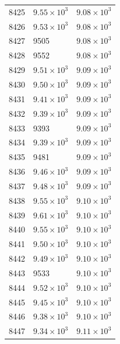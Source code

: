 \begin{table}[H]
\begin{tabular}{lll}
8425 & $\displaystyle 9.55 \times 10^{3}$ & $\displaystyle 9.08 \times 10^{3}$ \\
8426 & $\displaystyle 9.53 \times 10^{3}$ & $\displaystyle 9.08 \times 10^{3}$ \\
8427 & 9505 & $\displaystyle 9.08 \times 10^{3}$ \\
8428 & 9552 & $\displaystyle 9.08 \times 10^{3}$ \\
8429 & $\displaystyle 9.51 \times 10^{3}$ & $\displaystyle 9.09 \times 10^{3}$ \\
8430 & $\displaystyle 9.50 \times 10^{3}$ & $\displaystyle 9.09 \times 10^{3}$ \\
8431 & $\displaystyle 9.41 \times 10^{3}$ & $\displaystyle 9.09 \times 10^{3}$ \\
8432 & $\displaystyle 9.39 \times 10^{3}$ & $\displaystyle 9.09 \times 10^{3}$ \\
8433 & 9393 & $\displaystyle 9.09 \times 10^{3}$ \\
8434 & $\displaystyle 9.39 \times 10^{3}$ & $\displaystyle 9.09 \times 10^{3}$ \\
8435 & 9481 & $\displaystyle 9.09 \times 10^{3}$ \\
8436 & $\displaystyle 9.46 \times 10^{3}$ & $\displaystyle 9.09 \times 10^{3}$ \\
8437 & $\displaystyle 9.48 \times 10^{3}$ & $\displaystyle 9.09 \times 10^{3}$ \\
8438 & $\displaystyle 9.55 \times 10^{3}$ & $\displaystyle 9.10 \times 10^{3}$ \\
8439 & $\displaystyle 9.61 \times 10^{3}$ & $\displaystyle 9.10 \times 10^{3}$ \\
8440 & $\displaystyle 9.55 \times 10^{3}$ & $\displaystyle 9.10 \times 10^{3}$ \\
8441 & $\displaystyle 9.50 \times 10^{3}$ & $\displaystyle 9.10 \times 10^{3}$ \\
8442 & $\displaystyle 9.49 \times 10^{3}$ & $\displaystyle 9.10 \times 10^{3}$ \\
8443 & 9533 & $\displaystyle 9.10 \times 10^{3}$ \\
8444 & $\displaystyle 9.52 \times 10^{3}$ & $\displaystyle 9.10 \times 10^{3}$ \\
8445 & $\displaystyle 9.45 \times 10^{3}$ & $\displaystyle 9.10 \times 10^{3}$ \\
8446 & $\displaystyle 9.38 \times 10^{3}$ & $\displaystyle 9.10 \times 10^{3}$ \\
8447 & $\displaystyle 9.34 \times 10^{3}$ & $\displaystyle 9.11 \times 10^{3}$ \\

\end{tabular}
\end{table}

